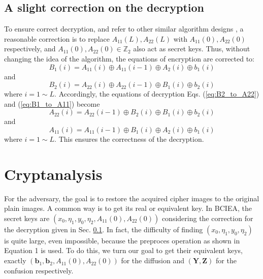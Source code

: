 \documentclass[final,3p,times,twocolumn]{elsarticle}
\begin{document}
\subsection{A slight correction on the decryption}
\label{ssec:correction}

To ensure correct decryption, and refer to other similar algorithm designs \cite{ozkaynak:review:ND18}, a reasonable correction is to replace $A_{11}(L),A_{22}(L)$ with $A_{11}(0),A_{22}(0)$ respectively, and $A_{11}(0),A_{22}(0) \in \mathbb{Z}_{2}$ also act as secret keys.
Thus, without changing the idea of the algorithm, the equations of encryption are corrected to:
\begin{equation}
B_1(i) = A_{11}(i) \oplus A_{11}(i-1) \oplus A_{2}(i) \oplus b_{1}(i)
\label{eq:corr_B1_diffusion}
\end{equation}
and 
\begin{equation}
B_2(i) = A_{22}(i) \oplus A_{22}(i-1) \oplus B_{1}(i) \oplus b_{2}(i)
\label{eq:corr_B2_diffusion}
\end{equation}
where $i=1 \sim L$. Accordingly, the equations of decryption Eqs. (\ref{eq:B2_to_A22}) and (\ref{eq:B1_to_A11}) become
\begin{equation}
A_{22}(i) = A_{22}(i-1) \oplus B_2(i) \oplus B_{1}(i) \oplus b_{2}(i)
\label{eq:corr_B2_to_A22}
\end{equation}
and
\begin{equation}
A_{11}(i) = A_{11}(i-1)\oplus B_1(i) \oplus A_{2}(i) \oplus b_{1}(i)
\label{eq:corr_B1_to_A11}
\end{equation}
where $i=1 \sim L$. 
This ensures the correctness of the decryption.

\section{Cryptanalysis}
\label{sec3:Cryptanalysis}

For the adversary, the goal is to restore the acquired cipher images to the original plain images. A common way is to get its real or equivalent key. In BCIEA, the secret keys are $(x_0,\eta_1,y_0,\eta_2,A_{11}(0),A_{22}(0))$ considering the correction for the decryption given in Sec. \ref{ssec:correction}. 
In fact, the difficulty of finding $(x_0,\eta_1,y_0,\eta_2)$ is quite large, even impossible, because the preproces operation as shown in Equation 1 is used. To do this, we turn our goal to get their equivalent keys, exactly $(\bm{b}_1,\bm{b}_2,A_{11}(0),A_{22}(0))$ for the diffusion and $(\bm{Y},\bm{Z})$ for the confusion respectively.
\end{document}
